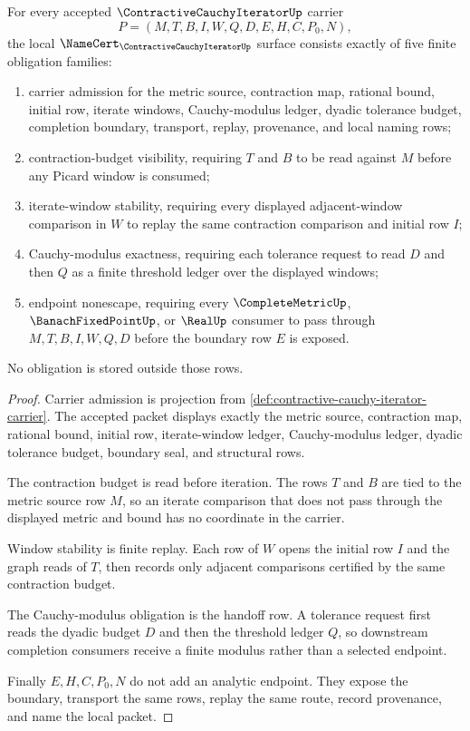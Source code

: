 \begin{theorem}
\label{thm:contractive-cauchy-iterator-namecert-obligations}
For every accepted $\ContractiveCauchyIteratorUp$ carrier
$$
P=(M,T,B,I,W,Q,D,E,H,C,P_0,N),
$$
the local $\NameCert_{\ContractiveCauchyIteratorUp}$ surface consists exactly of five finite obligation families:
\begin{enumerate}
\item carrier admission for the metric source, contraction map, rational bound, initial row, iterate windows, Cauchy-modulus ledger, dyadic tolerance budget, completion boundary, transport, replay, provenance, and local naming rows;
\item contraction-budget visibility, requiring $T$ and $B$ to be read against $M$ before any Picard window is consumed;
\item iterate-window stability, requiring every displayed adjacent-window comparison in $W$ to replay the same contraction comparison and initial row $I$;
\item Cauchy-modulus exactness, requiring each tolerance request to read $D$ and then $Q$ as a finite threshold ledger over the displayed windows;
\item endpoint nonescape, requiring every $\CompleteMetricUp$, $\BanachFixedPointUp$, or $\RealUp$ consumer to pass through $M,T,B,I,W,Q,D$ before the boundary row $E$ is exposed.
\end{enumerate}
No obligation is stored outside those rows.
\end{theorem}
\begin{proof}
Carrier admission is projection from \autoref{def:contractive-cauchy-iterator-carrier}. The accepted packet displays exactly the metric source, contraction map, rational bound, initial row, iterate-window ledger, Cauchy-modulus ledger, dyadic tolerance budget, boundary seal, and structural rows.

The contraction budget is read before iteration. The rows $T$ and $B$ are tied to the metric source row $M$, so an iterate comparison that does not pass through the displayed metric and bound has no coordinate in the carrier.

Window stability is finite replay. Each row of $W$ opens the initial row $I$ and the graph reads of $T$, then records only adjacent comparisons certified by the same contraction budget.

The Cauchy-modulus obligation is the handoff row. A tolerance request first reads the dyadic budget $D$ and then the threshold ledger $Q$, so downstream completion consumers receive a finite modulus rather than a selected endpoint.

Finally $E,H,C,P_0,N$ do not add an analytic endpoint. They expose the boundary, transport the same rows, replay the same route, record provenance, and name the local packet.
\end{proof}

